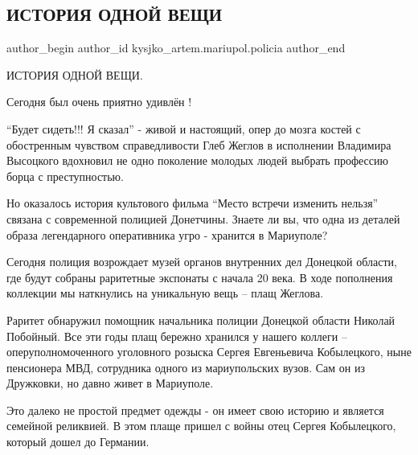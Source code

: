  
 
 
 
 

\subsection{ИСТОРИЯ ОДНОЙ ВЕЩИ}
\label{sec:15_01_2019.fb.kysjko_artem.mariupol.policia.1.istoriya_odnoi_veshc}

\ifcmt
 author_begin
   author_id kysjko_artem.mariupol.policia
 author_end
\fi

ИСТОРИЯ ОДНОЙ ВЕЩИ. 

Сегодня был очень приятно удивлён !

\enquote{Будет сидеть!!! Я сказал}  - живой и настоящий, опер до мозга костей с
обостренным чувством справедливости Глеб Жеглов в исполнении Владимира
Высоцкого вдохновил не одно поколение молодых людей выбрать  профессию борца с
преступностью.

Но оказалось  история культового фильма \enquote{Место встречи изменить нельзя}
связана с современной полицией Донетчины. Знаете ли вы, что одна из
деталей образа легендарного оперативника  угро - хранится в Мариуполе?

Сегодня полиция возрождает музей органов внутренних дел Донецкой области, где
будут собраны раритетные экспонаты с начала 20 века. В ходе пополнения
коллекции мы наткнулись на уникальную вещь – плащ Жеглова. 

Раритет обнаружил помощник начальника полиции Донецкой области Николай
Побойный. Все эти годы плащ бережно хранился у нашего коллеги –
оперуполномоченного уголовного розыска Сергея Евгеньевича Кобылецкого, ныне
пенсионера МВД, сотрудника одного из мариупольских вузов. Сам он из Дружковки,
но давно живет в Мариуполе. 

Это далеко не простой предмет одежды - он имеет свою историю и является
семейной реликвией. В этом плаще  пришел с войны отец Сергея Кобылецкого,
который дошел до Германии.

